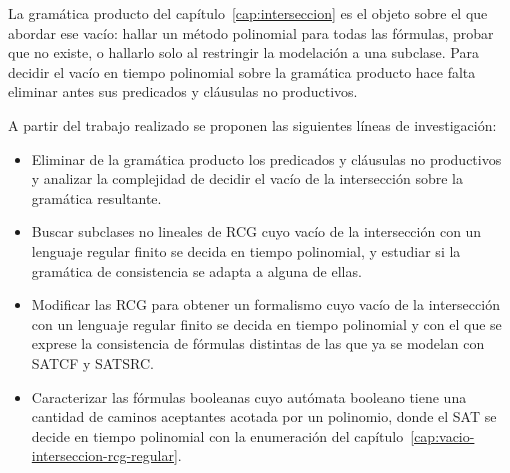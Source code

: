 La gramática producto del capítulo~\ref{cap:interseccion} es el objeto
sobre el que abordar ese vacío: hallar un método polinomial para todas
las fórmulas, probar que no existe, o hallarlo solo al restringir la
modelación a una subclase. Para decidir el vacío en tiempo polinomial
sobre la gramática producto hace falta eliminar antes sus predicados y
cláusulas no productivos.

A partir del trabajo realizado se proponen las siguientes líneas de
investigación:

\begin{itemize}
  \item Eliminar de la gramática producto los predicados y cláusulas no
    productivos y analizar la complejidad de decidir el vacío de la
    intersección sobre la gramática resultante.
  \item Buscar subclases no lineales de RCG cuyo vacío de la
    intersección con un lenguaje regular finito se decida en tiempo
    polinomial, y estudiar si la gramática de consistencia se adapta a
    alguna de ellas.
  \item Modificar las RCG para obtener un formalismo cuyo vacío de la
    intersección con un lenguaje regular finito se decida en tiempo
    polinomial y con el que se exprese la consistencia de fórmulas
    distintas de las que ya se modelan con SATCF y SATSRC.
  \item Caracterizar las fórmulas booleanas cuyo autómata booleano tiene
    una cantidad de caminos aceptantes acotada por un polinomio, donde el
    SAT se decide en tiempo polinomial con la enumeración del
    capítulo~\ref{cap:vacio-interseccion-rcg-regular}.
\end{itemize}


